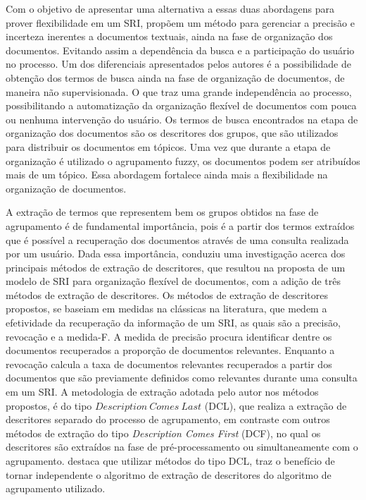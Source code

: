 Com o objetivo de apresentar uma alternativa a essas duas abordagens para prover flexibilidade em um
SRI, \cite{Nogueira2012} propõem um método para gerenciar a precisão e incerteza inerentes a
documentos textuais, ainda na fase de organização dos documentos. Evitando assim a dependência da
busca e a participação do usuário no processo. Um dos diferenciais apresentados pelos
autores é a possibilidade de obtenção dos termos de busca ainda na fase de organização de
documentos, de maneira não supervisionada. O que traz uma grande independência ao processo,
possibilitando a automatização da organização flexível de documentos com pouca ou nenhuma
intervenção do usuário. Os termos de busca encontrados na etapa de organização
dos documentos são os descritores dos grupos, que são utilizados para distribuir os documentos em
tópicos. Uma vez que durante a etapa de organização é utilizado o agrupamento fuzzy, os
documentos podem ser atribuídos mais de um tópico. Essa abordagem fortalece
ainda mais a flexibilidade na organização de documentos.

A extração de termos
que representem bem os grupos obtidos na fase de agrupamento é de fundamental importância, pois é
a partir dos termos extraídos que é possível a recuperação dos documentos através de uma consulta 
realizada por um usuário. Dada essa importância, \cite{Nogueira2013} conduziu uma investigação
acerca dos principais métodos de extração de descritores, que resultou na proposta de um
modelo de SRI para organização flexível de documentos, com
a adição de três métodos de extração de descritores. Os métodos de extração de descritores 
propostos, se baseiam em medidas na clássicas na literatura, que medem a efetividade da 
recuperação da informação de um SRI, as quais são a precisão, revocação e a medida-F. 
A medida de precisão procura identificar dentre os documentos recuperados a proporção de documentos
relevantes. Enquanto a revocação calcula a taxa de documentos relevantes recuperados a partir dos
documentos que são previamente definidos como relevantes durante uma consulta em um SRI.
A metodologia de extração adotada pelo autor nos métodos propostos, 
é do tipo $Description\ Comes\ Last$ (DCL), que
realiza a extração de descritores separado do processo de agrupamento, em contraste com outros
métodos de extração do tipo \textit{Description Comes First\/} (DCF), no qual os descritores 
são extraídos na
fase de pré-processamento ou simultaneamente com o agrupamento. \cite{Nogueira2013} destaca que
utilizar métodos do tipo DCL, traz o benefício de tornar independente o algoritmo de extração de
descritores do algoritmo de agrupamento utilizado. 

